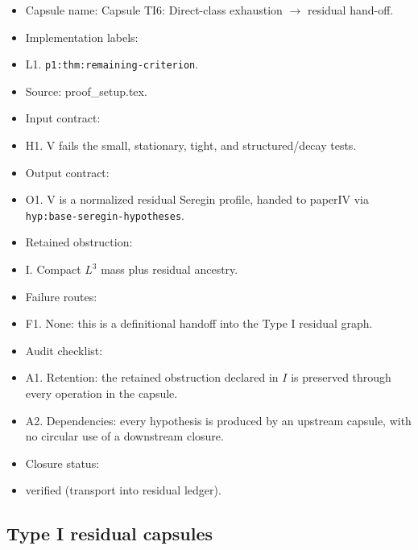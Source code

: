 \documentclass[11pt]{amsart}
\begin{document}
\begin{itemize}
  \item Capsule name: Capsule TI6: Direct-class exhaustion $\to$ residual hand-off.
  \item Implementation labels:
  \item L1. \texttt{p1:thm:remaining-criterion}.
  \item Source: proof\_setup.tex.
  \item Input contract:
  \item H1. V fails the small, stationary, tight, and structured/decay tests.
  \item Output contract:
  \item O1. V is a normalized residual Seregin profile, handed to paperIV via \texttt{hyp:base-seregin-hypotheses}.
  \item Retained obstruction:
  \item I. Compact $L^3$ mass plus residual ancestry.
  \item Failure routes:
  \item F1. None: this is a definitional handoff into the Type I residual graph.
  \item Audit checklist:
  \item A1. Retention: the retained obstruction declared in $I$ is preserved through every operation in the capsule.
  \item A2. Dependencies: every hypothesis is produced by an upstream capsule, with no circular use of a downstream closure.
  \item Closure status:
  \item verified (transport into residual ledger).
\end{itemize}

\subsection{Type I residual capsules}
\end{document}
